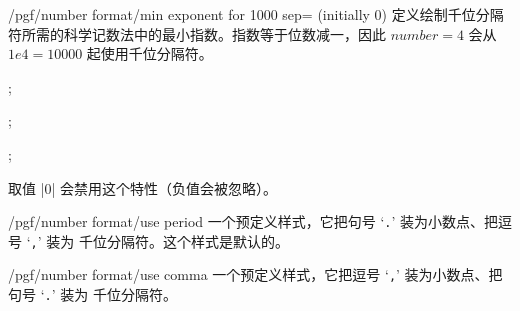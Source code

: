 \documentclass[a4paper,doc2]{ltxdoc}
\begin{document}
\begin{key}{/pgf/number format/min exponent for 1000 sep= (initially 0)}
    定义绘制千位分隔符所需的科学记数法中的最小指数。指数等于位数减一，因此
    $\mathit{number}=4$ 会从 $1e4 = 10000$ 起使用千位分隔符。
\begin{codeexample}[]
; 
\end{codeexample}

\begin{codeexample}[]
; 
\end{codeexample}

\begin{codeexample}[]
; 
\end{codeexample}
    \noindent 取值 |0| 会禁用这个特性（负值会被忽略）。
\end{key}


\begin{key}{/pgf/number format/use period}
    一个预定义样式，它把句号 `\texttt{.}' 装为小数点、把逗号 `\texttt{,}' 装为
    千位分隔符。这个样式是默认的。
\begin{codeexample}[]
\end{codeexample}

\begin{codeexample}[]
\end{codeexample}
\end{key}

\begin{key}{/pgf/number format/use comma}
    一个预定义样式，它把逗号 `\texttt{,}' 装为小数点、把句号 `\texttt{.}' 装为
    千位分隔符。
\begin{codeexample}[]
\end{codeexample}

\begin{codeexample}[]
\end{codeexample}
\end{key}
\end{document}
